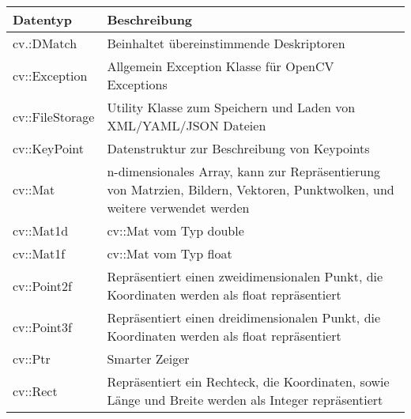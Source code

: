 \begin{table}[]
\begin{tabularx}{\textwidth}{ |l|X| }
\textbf{Datentyp}     & \textbf{Beschreibung}                                                                                                                                               \\ \hline
cv.:DMatch            & Beinhaltet übereinstimmende Deskriptoren \cite{opencv_doc_dmatch}                                                                                \\
cv::Exception         & Allgemein Exception Klasse für OpenCV Exceptions \cite{opencv_doc_exception}                                                                     \\
cv::FileStorage       & Utility Klasse zum Speichern und Laden von XML/YAML/JSON Dateien \cite{opencv_doc_file_storage}                                                 \\
cv::KeyPoint          & Datenstruktur zur Beschreibung von Keypoints \cite{opencv_doc_keypoint}                                                                          \\
cv::Mat               & n-dimensionales Array, kann zur Repräsentierung von Matrzien, Bildern, Vektoren, Punktwolken, und weitere verwendet werden \cite{opencv_doc_mat} \\
cv::Mat1d             & cv::Mat vom Typ double \cite{opencv_doc_mat1d}                                                                                                   \\
cv::Mat1f             & cv::Mat vom Typ float \cite{opencv_doc_mat1f}                                                                                                    \\
cv::Point2f           & Repräsentiert einen zweidimensionalen Punkt, die Koordinaten werden als float repräsentiert \cite{opencv_doc_point2f}                            \\
cv::Point3f           & Repräsentiert einen dreidimensionalen Punkt, die Koordinaten werden als float repräsentiert \cite{opencv_doc_point3f}                            \\
cv::Ptr               & Smarter Zeiger \cite{opencv_doc_ptr}                                                                                                             \\
cv::Rect              & Repräsentiert ein Rechteck, die Koordinaten, sowie Länge und Breite werden als Integer repräsentiert \cite{opencv_doc_rect}                      \\

\end{tabularx}
\end{table}
